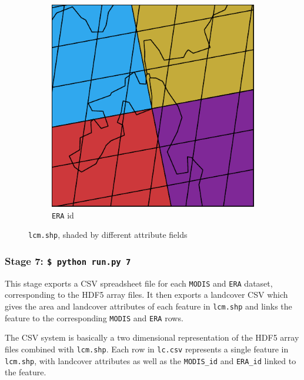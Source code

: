 \documentclass[twoside,a4paper]{refart}
\begin{document}
\begin{description}
\begin{figure}
\begin{subfigure}[b]{0.3\textwidth}
                \includegraphics[width=\textwidth]{thumbs/lcm_era}
                \caption{\texttt{ERA} id}
                \label{fig:lcm-era}
        \end{subfigure}
       
        \caption{\texttt{lcm.shp}, shaded by different attribute fields}\label{fig:lcm}
\end{figure}
  \end{description}



\subsubsection{\textbf{Stage 7:} \texttt{\$ python run.py 7}}
  This stage exports a CSV spreadsheet file for each 
  \texttt{MODIS} and \texttt{ERA} dataset, 
  corresponding to the HDF5 array files.  It then exports a landcover CSV 
  which gives the area and landcover attributes of each feature in 
  \texttt{lcm.shp} and links the feature to the corresponding 
  \texttt{MODIS} and \texttt{ERA} rows. 
  
  The CSV system is basically a two dimensional representation of the 
  HDF5 array files combined with \texttt{lcm.shp}.  Each row in \texttt{lc.csv} 
  represents a single feature in \texttt{lcm.shp}, with landcover attributes 
  as well as the \texttt{MODIS\_id} and \texttt{ERA\_id} linked to the feature.
\end{document}
